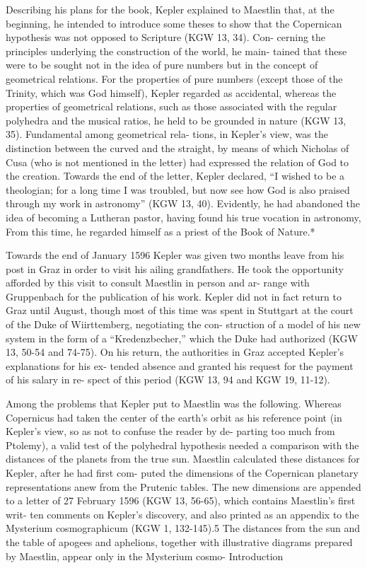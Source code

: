 \documentclass{article}
\begin{document}
Describing his plans for the book, Kepler explained to Maestlin that, at
the beginning, he intended to introduce some theses to show that the
Copernican hypothesis was not opposed to Scripture (KGW 13, 34). Con-
cerning the principles underlying the construction of the world, he main-
tained that these were to be sought not in the idea of pure numbers but in
the concept of geometrical relations. For the properties of pure numbers
(except those of the Trinity, which was God himself), Kepler regarded as
accidental, whereas the properties of geometrical relations, such as those
associated with the regular polyhedra and the musical ratios, he held to be
grounded in nature (KGW 13, 35). Fundamental among geometrical rela-
tions, in Kepler’s view, was the distinction between the curved and the
straight, by means of which Nicholas of Cusa (who is not mentioned in
the letter) had expressed the relation of God to the creation. Towards the
end of the letter, Kepler declared, “I wished to be a theologian; for a long
time I was troubled, but now see how God is also praised through my
work in astronomy” (KGW 13, 40). Evidently, he had abandoned the idea
of becoming a Lutheran pastor, having found his true vocation in
astronomy, From this time, he regarded himself as a priest of the Book of
Nature.*

Towards the end of January 1596 Kepler was given two months leave
from his post in Graz in order to visit his ailing grandfathers. He took the
opportunity afforded by this visit to consult Maestlin in person and ar-
range with Gruppenbach for the publication of his work. Kepler did not
in fact return to Graz until August, though most of this time was spent in
Stuttgart at the court of the Duke of Wiirttemberg, negotiating the con-
struction of a model of his new system in the form of a “Kredenzbecher,”
which the Duke had authorized (KGW 13, 50-54 and 74-75). On his
return, the authorities in Graz accepted Kepler’s explanations for his ex-
tended absence and granted his request for the payment of his salary in re-
spect of this period (KGW 13, 94 and KGW 19, 11-12).

Among the problems that Kepler put to Maestlin was the following.
Whereas Copernicus had taken the center of the earth’s orbit as his
reference point (in Kepler’s view, so as not to confuse the reader by de-
parting too much from Ptolemy), a valid test of the polyhedral hypothesis
needed a comparison with the distances of the planets from the true sun.
Maestlin calculated these distances for Kepler, after he had first com-
puted the dimensions of the Copernican planetary representations anew
from the Prutenic tables. The new dimensions are appended to a letter of
27 February 1596 (KGW 13, 56-65), which contains Maestlin’s first writ-
ten comments on Kepler’s discovery, and also printed as an appendix to
the Mysterium cosmographicum (KGW 1, 132-145).5 The distances from
the sun and the table of apogees and aphelions, together with illustrative
diagrams prepared by Maestlin, appear only in the Mysterium cosmo-
Introduction
\end{document}
